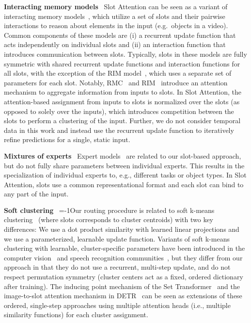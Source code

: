 \documentclass{article}
\begin{document}
\textbf{Interacting memory models} \ Slot Attention can be seen as a variant of interacting memory models~\citep{watters2017visual,van2018relational,santoro2018relational,zambaldi2018relational,watters2019cobra,stanic2019r,goyal2019recurrent,kipf2019contrastive,veerapaneni2020entity}, which utilize a set of slots and their pairwise interactions to reason about elements in the input (e.g.~objects in a video). Common components of these models are (i) a recurrent update function that acts independently on individual slots and (ii) an interaction function that introduces communication between slots. Typically, slots in these models are fully symmetric with shared recurrent update functions and interaction functions for all slots, with the exception of the RIM model~\citep{goyal2019recurrent}, which uses a separate set of parameters for each slot. Notably, RMC~\citep{santoro2018relational} and RIM~\citep{goyal2019recurrent} introduce an attention mechanism to aggregate information from inputs to slots. In Slot Attention, the attention-based assignment from inputs to slots is normalized over the slots (as opposed to solely over the inputs), which introduces competition between the slots to perform a clustering of the input. Further, we do not consider temporal data in this work and instead use the recurrent update function to iteratively refine predictions for a single, static input.


\textbf{Mixtures of experts} \ Expert models~\citep{jacobs1991adaptive,parascandolo2018learning,locatello2018competitive,goyal2019recurrent,von2020towards} are related to our slot-based approach, but do not fully share parameters between individual experts. This results in the specialization of individual experts to, e.g., different tasks or object types. In Slot Attention, slots use a common representational format and each slot can bind to any part of the input.

\textbf{Soft clustering} \
\looseness=-1Our routing procedure is related to soft k-means clustering~\cite{bauckhage2015lecture} (where slots corresponds to cluster centroids) with two key differences: We use a dot product similarity with learned linear projections and we use a parameterized, learnable update function. Variants of soft k-means clustering with learnable, cluster-specific parameters have been introduced in the computer vision~\citep{arandjelovic2016netvlad} and speech recognition communities~\citep{cai2018novel}, but they differ from our approach in that they do not use a recurrent, multi-step update, and do not respect permutation symmetry (cluster centers act as a fixed, ordered dictionary after training). The inducing point mechanism of the Set Transformer~\citep{lee2018set} and the image-to-slot attention mechanism in DETR~\citep{carion2020detr} can be seen as extensions of these ordered, single-step approaches using multiple attention heads (i.e., multiple similarity functions) for each cluster assignment.
\end{document}
